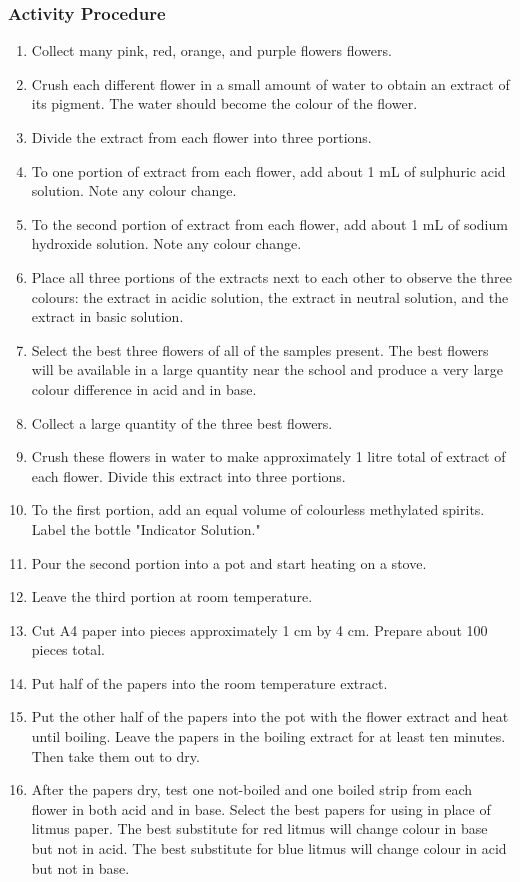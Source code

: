 \subsubsection*{Activity Procedure}
\begin{enumerate}
\item{Collect many pink, red, orange, and purple flowers flowers.}
\item{Crush each different flower in a small amount of water to obtain an extract of its pigment. The water should become the colour of the flower.}
\item{Divide the extract from each flower into three portions.}
\item{To one portion of extract from each flower, add about 1 mL of sulphuric acid solution. Note any colour change.}
\item{To the second portion of extract from each flower, add about 1 mL of sodium hydroxide solution. Note any colour change.}
\item{Place all three portions of the extracts next to each other to observe the three colours: the extract in acidic solution, the extract in neutral solution, and the extract in basic solution.}
\item{Select the best three flowers of all of the samples present. The best flowers will be available in a large quantity near the school and produce a very large colour difference in acid and in base.}
\item{Collect a large quantity of the three best flowers.}
\item{Crush these flowers in water to make approximately 1 litre total of extract of each flower. Divide this extract into three portions.}
\item{To the first portion, add an equal volume of colourless methylated spirits. Label the bottle "Indicator Solution."}
\item{Pour the second portion into a pot and start heating on a stove.}
\item{Leave the third portion at room temperature.}
\item{Cut A4 paper into pieces approximately 1 cm by 4 cm. Prepare about 100 pieces total.}
\item{Put half of the papers into the room temperature extract.}
\item{Put the other half of the papers into the pot with the flower extract and heat until boiling. Leave the papers in the boiling extract for at least ten minutes. Then take them out to dry.}
\item{After the papers dry, test one not-boiled and one boiled strip from each flower in both acid and in base. Select the best papers for using in place of litmus paper. The best substitute for red litmus will change colour in base but not in acid. The best substitute for blue litmus will change colour in acid but not in base.}
\end{enumerate}

